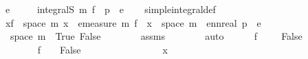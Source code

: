 \begin{isabellebody}
{\isachardoublequoteopen}e\ {\isachargreater}{\kern0pt}\ {}{\isachardoublequoteclose}\isanewline
\ \ \ {\isachardoublequoteopen}integral\isactrlsup S\ m\ f\ {\isacharequal}{\kern0pt}\ p{}\ {\isacharasterisk}{\kern0pt}\ e{\isachardoublequoteclose}\isanewline
%
\isadelimproof
\ \ %
\endisadelimproof
%
\isatagproof
{}\isamarkupfalse%
\ simple{\isacharunderscore}{\kern0pt}integral{\isacharunderscore}{\kern0pt}def\isanewline
{}\isamarkupfalse%
{\isacharminus}{\kern0pt}\isanewline
\ \ \isamarkupfalse%
{\isachardoublequoteopen}{\isacharparenleft}{\kern0pt}{\isasymSum}x{\isasymin}f\ {\isacharbackquote}{\kern0pt}\ space\ m{\isachardot}{\kern0pt}\ x\ {\isacharasterisk}{\kern0pt}\ emeasure\ m\ {\isacharparenleft}{\kern0pt}f\ {\isacharminus}{\kern0pt}{\isacharbackquote}{\kern0pt}\ {\isacharbraceleft}{\kern0pt}x{\isacharbraceright}{\kern0pt}\ {\isasyminter}\ space\ m{\isacharparenright}{\kern0pt}{\isacharparenright}{\kern0pt}\ {\isacharequal}{\kern0pt}\ ennreal\ {\isacharparenleft}{\kern0pt}p{}\ {\isacharasterisk}{\kern0pt}\ e{\isacharparenright}{\kern0pt}{\isachardoublequoteclose}\isanewline
\ \ \isamarkupfalse%
{\isacharminus}{\kern0pt}\isanewline
\ \ \ \ \isamarkupfalse%
\ {\isachardoublequoteopen}space\ m\ {\isacharequal}{\kern0pt}\ {\isacharbraceleft}{\kern0pt}True{\isacharcomma}{\kern0pt}\ False{\isacharbraceright}{\kern0pt}{\isachardoublequoteclose}\isanewline
\ \ \ \ \ \ \isamarkupfalse%
\ assms{\isacharparenleft}{\kern0pt}{}{\isacharparenright}{\kern0pt}\isanewline
\ \ \ \ \ \ \isamarkupfalse%
\ auto\isanewline
\ \ \ \ \isamarkupfalse%
\ {\isachardoublequoteopen}f\ {\isacharminus}{\kern0pt}{\isacharbackquote}{\kern0pt}\ {\isacharbraceleft}{\kern0pt}{}{\isacharbraceright}{\kern0pt}\ \ {\isacharequal}{\kern0pt}\ {\isacharbraceleft}{\kern0pt}False{\isacharbraceright}{\kern0pt}{\isachardoublequoteclose}\isanewline
\ \ \ \ \isamarkupfalse%
\ \isanewline
\ \ \ \ \ \ \isamarkupfalse%
{\isachardoublequoteopen}f\ {\isacharminus}{\kern0pt}{\isacharbackquote}{\kern0pt}\ {\isacharbraceleft}{\kern0pt}{}{\isacharbraceright}{\kern0pt}\ {\isasymsubseteq}\ {\isacharbraceleft}{\kern0pt}False{\isacharbraceright}{\kern0pt}{\isachardoublequoteclose}\isanewline
\ \ \ \ \ \ \isamarkupfalse%
\isanewline
\ \ \ \ \ \ \ \ \isamarkupfalse%
\ x\isanewline
\ \ \ \ \ \ \ \ \isamarkupfalse%

\end{isabellebody}
